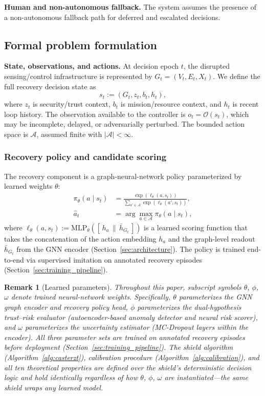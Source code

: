 \documentclass[10pt,journal,compsoc]{IEEEtran}
\newtheorem{remark}{Remark}
\begin{document}
\noindent\textbf{Human and non-autonomous fallback.}
The system assumes the presence of a non-autonomous fallback path for deferred and escalated decisions.


\subsection{Formal problem formulation}

\noindent\textbf{State, observations, and actions.}
At decision epoch $t$, the disrupted sensing/control infrastructure is represented by $G_t = (V_t, E_t, X_t)$.
We define the full recovery decision state as
\[
s_t := (G_t, z_t, b_t, h_t),
\]
where $z_t$ is security/trust context, $b_t$ is mission/resource context, and $h_t$ is recent loop history.
The observation available to the controller is $o_t = \mathcal{O}(s_t)$, which may be incomplete, delayed, or adversarially perturbed.
The bounded action space is $\mathcal{A}$, assumed finite with $|\mathcal{A}| < \infty$.

\subsubsection{Recovery policy and candidate scoring}
The recovery component is a graph-neural-network policy parameterized by learned weights $\theta$:
\begin{align*}
\pi_\theta(a \mid s_t) &= \frac{\exp(\ell_\theta(a, s_t))}{\sum_{a' \in \mathcal{A}} \exp(\ell_\theta(a', s_t))},\\
\hat{a}_t &= \arg\max_{a \in \mathcal{A}} \pi_\theta(a \mid s_t),
\end{align*}
where $\ell_\theta(a, s_t) := \mathrm{MLP}_\theta([\,h_a \,\|\, \bar{h}_{G_t}\,])$ is a learned scoring function that takes the concatenation of the action embedding $h_a$ and the graph-level readout $\bar{h}_{G_t}$ from the GNN encoder (Section~\ref{sec:architecture}).
The policy is trained end-to-end via supervised imitation on annotated recovery episodes (Section~\ref{sec:training_pipeline}).

\begin{remark}[Learned parameters]
\label{rem:notation}
Throughout this paper, subscript symbols $\theta$, $\phi$, $\omega$ denote \emph{trained neural-network weights}.
Specifically, $\theta$ parameterizes the GNN graph encoder and recovery policy head, $\phi$ parameterizes the dual-hypothesis trust--risk evaluator (autoencoder-based anomaly detector and neural risk scorer), and $\omega$ parameterizes the uncertainty estimator (MC-Dropout layers within the encoder).
All three parameter sets are trained on annotated recovery episodes before deployment (Section~\ref{sec:training_pipeline}).
The shield algorithm (Algorithm~\ref{alg:casterzt}), calibration procedure (Algorithm~\ref{alg:calibration}), and all ten theoretical properties are defined over the shield's deterministic decision logic and hold identically regardless of how $\theta$, $\phi$, $\omega$ are instantiated---the same shield wraps any learned model.
\end{remark}
\end{document}

